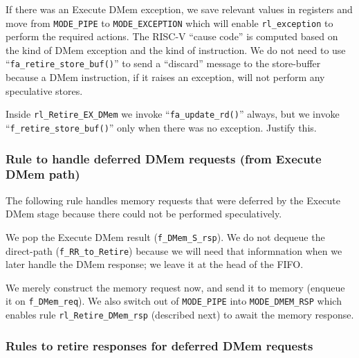 If there was an Execute DMem exception, we save relevant values in
registers and move from \verb|MODE_PIPE| to \verb|MODE_EXCEPTION|
which will enable \verb|rl_exception| to perform the required actions.
The RISC-V ``cause code'' is computed based on the kind of DMem
exception and the kind of instruction.  We do not need to use
``\verb|fa_retire_store_buf()|'' to send a ``discard'' message to the
store-buffer because a DMem instruction, if it raises an exception,
will not perform any speculative stores.


\Exercise

Inside \verb|rl_Retire_EX_DMem| we invoke ``\verb|fa_update_rd()|''
always, but we invoke ``\verb|f_retire_store_buf()|'' only when there
was no exception.  Justify this.

\Endexercise


\subsubsection{Rule to handle deferred DMem requests (from Execute DMem path)}

\label{Sec_Fife_DMem_deferred}

The following rule handles memory requests that were deferred by the
Execute DMem stage because there could not be performed speculatively.


We pop the Execute DMem result (\verb|f_DMem_S_rsp|).  We do not
dequeue the direct-path (\verb|f_RR_to_Retire|) because we will need
that informnation when we later handle the DMem response; we leave it
at the head of the FIFO.

We merely construct the memory request now, and send it to memory
(enqueue it on \verb|f_DMem_req|).  We also switch out of
\verb|MODE_PIPE| into \verb|MODE_DMEM_RSP| which enables rule
\verb|rl_Retire_DMem_rsp| (described next) to await the memory
response.


\subsubsection{Rules to retire responses for deferred DMem requests}

